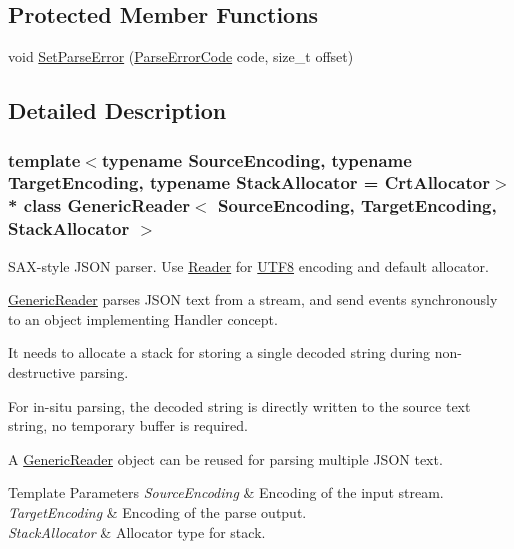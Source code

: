 \subsection*{Protected Member Functions}
\begin{DoxyCompactItemize}
\item 
void \hyperlink{classGenericReader_ae50079444295bf109730c3b708a818a6}{Set\+Parse\+Error} (\hyperlink{group__RAPIDJSON__ERRORS_ga8d4b32dfc45840bca189ade2bbcb6ba7}{Parse\+Error\+Code} code, size\+\_\+t offset)
\end{DoxyCompactItemize}


\subsection{Detailed Description}
\subsubsection*{template$<$typename Source\+Encoding, typename Target\+Encoding, typename Stack\+Allocator = Crt\+Allocator$>$\\*
class Generic\+Reader$<$ Source\+Encoding, Target\+Encoding, Stack\+Allocator $>$}

S\+A\+X-\/style J\+S\+ON parser. Use \hyperlink{reader_8h_a84f3b66a66647f4ac4267078359188ba}{Reader} for \hyperlink{structUTF8}{U\+T\+F8} encoding and default allocator. 

\hyperlink{classGenericReader}{Generic\+Reader} parses J\+S\+ON text from a stream, and send events synchronously to an object implementing Handler concept.

It needs to allocate a stack for storing a single decoded string during non-\/destructive parsing.

For in-\/situ parsing, the decoded string is directly written to the source text string, no temporary buffer is required.

A \hyperlink{classGenericReader}{Generic\+Reader} object can be reused for parsing multiple J\+S\+ON text.


\begin{DoxyTemplParams}{Template Parameters}
{\em Source\+Encoding} & Encoding of the input stream. \\
\hline
{\em Target\+Encoding} & Encoding of the parse output. \\
\hline
{\em Stack\+Allocator} & Allocator type for stack. \\
\hline
\end{DoxyTemplParams}


